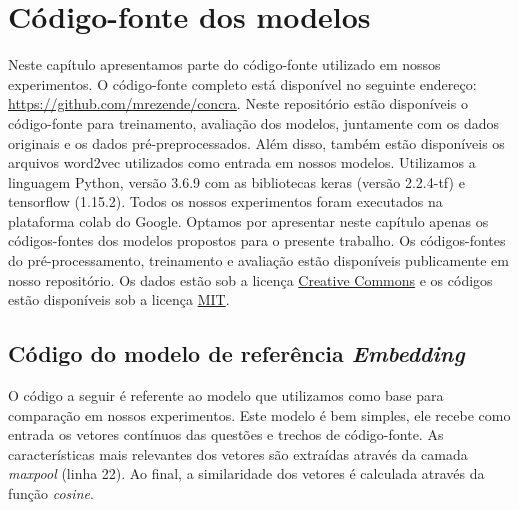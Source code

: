 \chapter{Código-fonte dos modelos}
\label{ape:codigo-fonte-dos-modelos}

Neste capítulo apresentamos parte do código-fonte utilizado em nossos experimentos. O código-fonte completo está disponível no seguinte endereço: \url{https://github.com/mrezende/concra}. Neste repositório estão disponíveis o código-fonte para treinamento, avaliação dos modelos, juntamente com os dados originais e os dados pré-preprocessados. Além disso, também estão disponíveis os arquivos word2vec utilizados como entrada em nossos modelos. Utilizamos a linguagem Python, versão 3.6.9 com as bibliotecas \Gls{keras} (versão 2.2.4-tf) e \Gls{tensorflow} (1.15.2). Todos os nossos experimentos foram executados na plataforma \Gls{colab} do Google. Optamos por apresentar neste capítulo apenas os códigos-fontes dos modelos propostos para o presente trabalho. Os códigos-fontes do pré-processamento, treinamento e avaliação estão disponíveis publicamente em nosso repositório. Os dados estão sob a licença \href{https://creativecommons.org/licenses/by/4.0/}{Creative Commons} e os códigos estão disponíveis sob a licença \href{https://opensource.org/licenses/MIT}{MIT}.

\section{Código do modelo de referência \textit{Embedding}}
\label{sec:codigo-modelo-embedding}

O código a seguir é referente ao modelo que utilizamos como base para comparação em nossos experimentos. Este modelo é bem simples, ele recebe como entrada os vetores contínuos das questões e trechos de código-fonte. As características mais relevantes dos vetores são extraídas através da camada \textit{maxpool} (linha 22). Ao final, a similaridade dos vetores é calculada através da função \textit{cosine}. 

